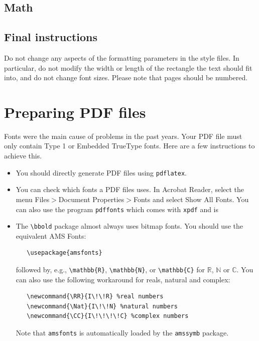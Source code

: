 \documentclass{article}
\begin{document}
\subsection{Math}

\subsection{Final instructions}

Do not change any aspects of the formatting parameters in the style files.  In
particular, do not modify the width or length of the rectangle the text should
fit into, and do not change font sizes. Please note that pages should be
numbered.


\section{Preparing PDF files}


Fonts were the main cause of problems in the past years. Your PDF file must only
contain Type 1 or Embedded TrueType fonts. Here are a few instructions to
achieve this.


\begin{itemize}


\item You should directly generate PDF files using \verb+pdflatex+.


\item You can check which fonts a PDF files uses.  In Acrobat Reader, select the
  menu Files$>$Document Properties$>$Fonts and select Show All Fonts. You can
  also use the program \verb+pdffonts+ which comes with \verb+xpdf+ and is

\item The \verb+\bbold+ package almost always uses bitmap fonts.  You should use
  the equivalent AMS Fonts:
\begin{verbatim}
   \usepackage{amsfonts}
\end{verbatim}
followed by, e.g., \verb+\mathbb{R}+, \verb+\mathbb{N}+, or \verb+\mathbb{C}+
for $\mathbb{R}$, $\mathbb{N}$ or $\mathbb{C}$.  You can also use the following
workaround for reals, natural and complex:
\begin{verbatim}
   \newcommand{\RR}{I\!\!R} %real numbers
   \newcommand{\Nat}{I\!\!N} %natural numbers
   \newcommand{\CC}{I\!\!\!\!C} %complex numbers
\end{verbatim}
Note that \verb+amsfonts+ is automatically loaded by the \verb+amssymb+ package.


\end{itemize}
\end{document}
